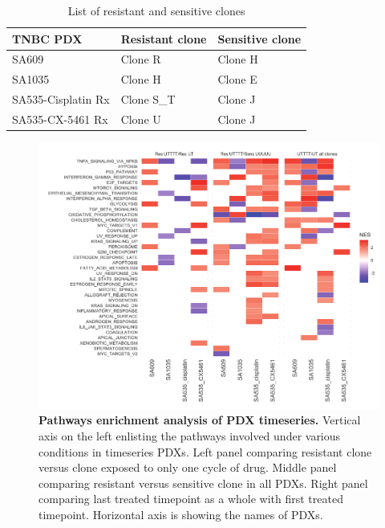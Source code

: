  \begin{table}[htbp]
   
   \centering
   \caption{List of resistant and sensitive clones}
     \begin{tabular}{|l|l|l|}
      \hline
     TNBC PDX & Resistant clone & Sensitive clone \\
     \hline
     SA609  & Clone R & Clone H \\
     SA1035 & Clone H & Clone E \\
     SA535-Cisplatin Rx & Clone S\_T & Clone J \\
     SA535-CX-5461 Rx & Clone U & Clone J \\    \hline
     \end{tabular}%
   \label{tab:addlabel}%
   
  
 \end{table}%

















\begin{figure}
\centering
  \includegraphics[width=\textwidth]{Figures/fig5pathwaysnetwork.pdf}
\caption[Pathways enrichment analysis of PDX timeseries]
	{\small
	\textbf{Pathways enrichment analysis of PDX timeseries.}
	 Vertical axis on the left enlisting the pathways involved under various conditions in timeseries PDXs. Left panel comparing resistant clone versus clone exposed to only one cycle of drug. Middle panel comparing resistant versus sensitive clone in all PDXs. Right panel comparing last treated timepoint as a whole with first treated timepoint. Horizontal axis is showing the names of PDXs.
	}
	\label{fig:fig5pathwaysnetwork}
\end{figure}

